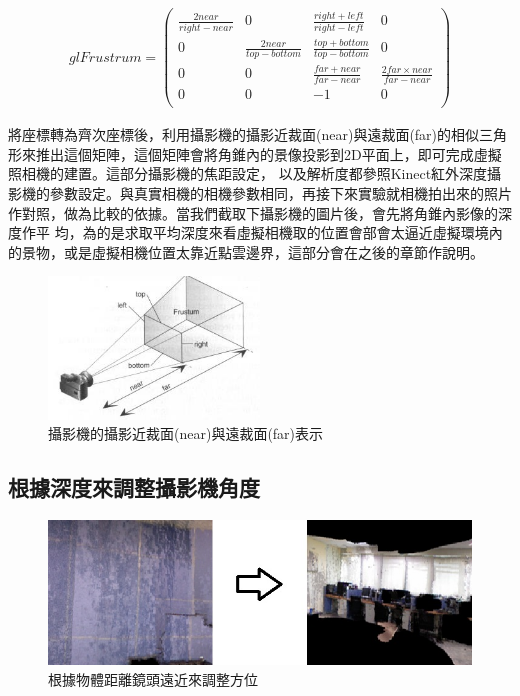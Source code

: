 	\begin{align}
	glFrustrum = \left(
		 			\begin{array}{cccc}
		 			\frac{2near}{right - near} & 0 & \frac{right + left}{right - left} & 0 \\
		 			0 & \frac{2near}{top - bottom} & \frac{top + bottom}{top - bottom} & 0 \\
		 			0 & 0 & \frac{far + near}{far - near}  & \frac{2far \times near}{far - near} \\
		 			0 & 0 & -1 & 0 \\
		 			\end{array}
		 		\right)
	\end{align}
	
	                    
	將座標轉為齊次座標後，利用攝影機的攝影近裁面(near)與遠裁面(far)的相似三角形來推出這個矩陣，這個矩陣會將角錐內的景像投影到2D平面上，即可完成虛擬照相機的建置。這部分攝影機的焦距設定，
	以及解析度都參照Kinect紅外深度攝影機的參數設定。與真實相機的相機參數相同，再接下來實驗就相機拍出來的照片作對照，做為比較的依據。當我們截取下攝影機的圖片後，會先將角錐內影像的深度作平
	均，為的是求取平均深度來看虛擬相機取的位置會部會太逼近虛擬環境內的景物，或是虛擬相機位置太靠近點雲邊界，這部分會在之後的章節作說明。
	
	\begin{figure}
	\begin{center}
	  \includegraphics[width=0.5\textwidth]{figures/Camera_image.jpg}
	  \caption{攝影機的攝影近裁面(near)與遠裁面(far)表示}
	  \label{fig:glFrustum}
	\end{center}
	\end{figure}	

\subsection{根據深度來調整攝影機角度}
%

	\begin{figure}
	\begin{center}
	  \includegraphics[width=1.0\textwidth]{figures/Depth_Filter.jpg}
	  \caption{根據物體距離鏡頭遠近來調整方位}
	  \label{fig:Depth_Filter}
	\end{center}
	\end{figure}


